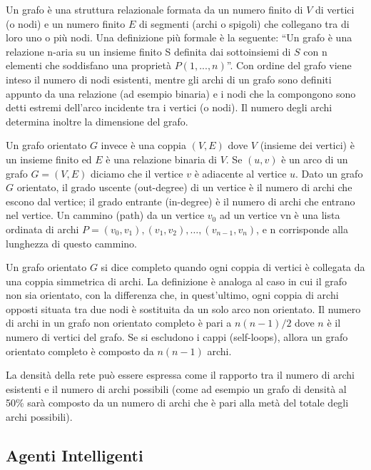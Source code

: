 \documentclass[11pt]{article}
\begin{document}
Un grafo è una struttura relazionale formata da un numero finito di $V$ di vertici (o nodi) e un numero finito $E$ di segmenti (archi o spigoli) che collegano tra di loro uno o più nodi.
Una definizione più formale è la seguente: “Un grafo è una relazione n-aria su un insieme finito S definita dai sottoinsiemi di $S$ con n elementi che soddisfano una proprietà $P(1,...,n)$”.
Con ordine del grafo viene inteso il numero di nodi esistenti, mentre gli archi di un grafo sono definiti appunto da una relazione (ad esempio binaria) e i nodi che la compongono sono detti estremi dell'arco incidente tra i vertici (o nodi). Il numero degli archi determina inoltre la dimensione del grafo. \cite{IntroToAlgorithms}

Un grafo orientato $G$ invece è una coppia $(V,E)$ dove $V$ (insieme dei vertici) è un insieme finito ed $E$ è una relazione binaria di $V$.
Se $(u,v)$ è un arco di un grafo $G = (V,E)$ diciamo che il vertice $v$ è adiacente al vertice $u$.
Dato un grafo $G$ orientato, il grado uscente (out-degree) di un vertice è il numero di archi che escono dal vertice; il grado entrante (in-degree) è il numero di archi che entrano nel vertice.
Un cammino (path) da un vertice $v_0$ ad un vertice vn è una lista ordinata di archi $P={(v_0,v_1),(v_1,v_2), … , (v_{n-1}, v_n)}$, e n corrisponde alla lunghezza di questo cammino.

Un grafo orientato $G$ si dice completo quando ogni coppia di vertici è collegata da una coppia simmetrica di archi. La definizione è analoga al caso in cui il grafo non sia orientato, con la differenza che, in quest'ultimo, ogni coppia di archi opposti situata tra due nodi è sostituita da un solo arco non orientato. Il numero di archi in un grafo non orientato completo è pari a $n(n-1)/2$ dove $n$ è il numero di vertici del grafo. Se si escludono i cappi (self-loops), allora un grafo orientato completo è composto da $n(n-1)$ archi.

La densità della rete può essere espressa come il rapporto tra il numero di archi esistenti e il numero di archi possibili (come ad esempio un grafo di densità al 50\% sarà composto da un numero di archi che è pari alla metà del totale degli archi possibili). \cite{NetworkScience}

\subsection{Agenti Intelligenti}
\end{document}
